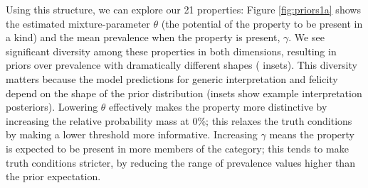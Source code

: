 \documentclass[10pt,letterpaper]{article}
\begin{document}


Using this structure, we can explore our 21 properties:
Figure \ref{fig:priors1a} shows the estimated mixture-parameter $\theta$ (the potential of the property to be present in a kind) and the mean prevalence when the property is present, $\gamma$. 
We see significant diversity among these properties in both dimensions, resulting in priors over prevalence with dramatically different shapes ( insets). 
This diversity matters because the model predictions for generic interpretation and felicity depend on the shape of the prior distribution (insets show example interpretation posteriors).
Lowering $\theta$ effectively makes the property more distinctive by increasing the relative probability mass at 0\%; this relaxes the truth conditions by making a lower threshold more informative.
Increasing $\gamma$ means the property is expected to be present in more members of the category; this tends to make truth conditions stricter, by reducing the range of prevalence values higher than the prior expectation. 
 
 
\end{document}

